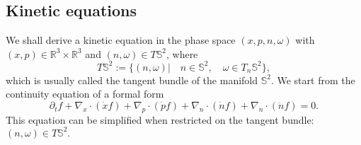 \documentclass[reqno]{amsart}
\numberwithin{equation}{section}
\theoremstyle{definition}
\theoremstyle{remark}
\begin{document}
\subsection{Kinetic equations}
We shall derive a kinetic equation in the phase space $(x, p, n,
\omega)$ with $(x, p)\in \mathbb{R}^3 \times \mathbb{R}^3$ and $(n,
\omega)\in  T\mathbb{S}^2$, where
\begin{equation}\label{mm}
    T\mathbb{S}^2:=\{(n, \omega)| \quad n\in \mathbb{S}^2, \quad \omega \in
    T_n\mathbb{S}^2\},
\end{equation}
which is usually called the tangent bundle of the manifold
$\mathbb{S}^2$.  We start from the continuity equation of a formal
form
\begin{equation}\label{fp3}
\partial_t f+\nabla_x \cdot (\dot x f) +\nabla_p \cdot (\dot p f)+\nabla_{n} \cdot (\dot
n f)+\nabla_{\dot n} \cdot (\ddot n f)=0.
\end{equation}
This equation can be simplified when restricted on the tangent
bundle: $(n, \omega)\in T\mathbb{S}^2 .$
\end{document}
